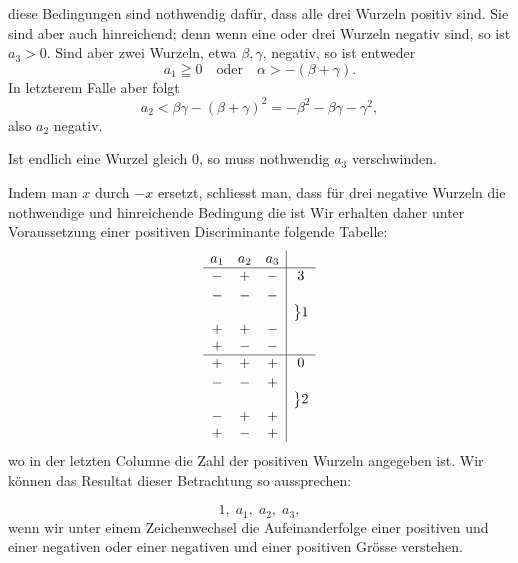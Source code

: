
diese Bedingungen sind nothwendig dafür, dass alle drei Wurzeln
positiv sind. Sie sind aber auch hinreichend; denn wenn eine
oder drei Wurzeln negativ sind, so ist $a_3 > 0$. Sind aber zwei
Wurzeln, etwa $\beta, \gamma$, negativ, so ist entweder
\[
a_1 \geqq 0 \quad \text{oder} \quad \alpha > -(\beta + \gamma).
\]
In letzterem Falle aber folgt
\[
a_2 < \beta\gamma - (\beta + \gamma)^2 = -\beta^2 - \beta\gamma - \gamma^2,
\]
also $a_2$ negativ.

Ist endlich eine Wurzel gleich 0, so muss nothwendig $a_3$
verschwinden.

Indem man $x$ durch $-x$ ersetzt, schliesst man, dass für drei
negative Wurzeln die nothwendige und hinreichende Bedingung die
ist
Wir erhalten daher unter Voraussetzung einer positiven
Discriminante folgende Tabelle:
\[
\begin{array}{ccc|c}
a_1 & a_2 & a_3 & \\ \hline
- & + & - & 3\\[2pt]
- & - & - & \\
+ & + & - & \raisebox{1.2em}{$\big\}1$}\\
+ & - & - & \\ \hline
+ & + & + & 0\\[2pt]
- & - & + & \\
- & + & + & \raisebox{1.2em}{$\big\}2$}\\
+ & - & + &
\end{array}
\]
wo in der letzten Columne die Zahl der positiven Wurzeln angegeben
ist. Wir können das Resultat dieser Betrachtung so aussprechen:

\[
1, \; a_1, \; a_2, \; a_3,
\]
wenn wir unter einem Zeichenwechsel die Aufeinanderfolge einer
positiven und einer negativen oder einer negativen und einer
positiven Grösse verstehen.
